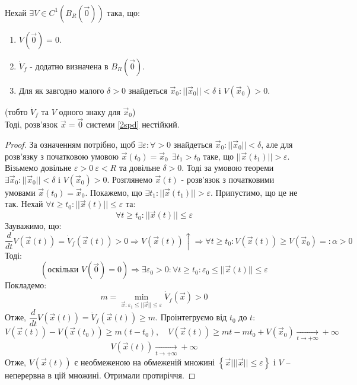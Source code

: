 \documentclass[14pt,a4paper]{scrartcl}
\theoremstyle{definition}
\theoremstyle{definition}
\theoremstyle{definition}
\begin{document}
\begin{boxteo} \ \\Нехай $\exists V \in C^{1} (B_R (\overrightarrow{0}))$ така, що:
\begin{enumerate}
  \item $V(\overrightarrow{0}) = 0$.
  \item $\dot{V}_f $ - додатно визначена в $B_R (\overrightarrow{0})$.
  \item Для як завгодно малого $\delta > 0 $ знайдеться $\overrightarrow{x}_0 : ||\overrightarrow{x}_0|| < \delta $ i $V (\overrightarrow{x}_0) > 0 $.
\end{enumerate}
(тобто $\dot{V}_f$ та $V$ одного знаку для $\overrightarrow{x}_0$)\\
Тоді, розв'язок $\overrightarrow{x} = \overrightarrow{0} $ системи \eqref{2spd} нестійкий.
\end{boxteo}

\begin{proof}
 За означенням потрібно, щоб $\exists \varepsilon : \forall > 0 $ знайдеться $\overrightarrow{x}_0 : ||\overrightarrow{x}_0|| < \delta$, але для розв'язку з початковою умовою $\overrightarrow{x}(t_0) = \overrightarrow{x}_0 \ \ \exists t_1 > t_0 $ таке, що $||\overrightarrow{x} (t_1)||>\varepsilon $. Візьмемо довільне $ \varepsilon > 0 \ \varepsilon  < R  $ та довільне $\delta > 0$. Тоді за умовою теореми $\exists \overrightarrow{x}_0 : ||\overrightarrow{x}_0|| < \delta $ і $V(\overrightarrow{x}_0) > 0$. Розглянемо $\overrightarrow{x}(t)$ - розв'язок з початковими умовами $\overrightarrow{x}(t_0) = \overrightarrow{x}_0$. Покажемо, що $\exists t_1 : ||\overrightarrow{x}(t_1)|| > \varepsilon $. Припустимо, що це не так. Нехай $\forall t \geq t_0 : ||\overrightarrow{x}(t)|| \leq \varepsilon $ та:
$$
\forall t \geq t_0 : ||\overrightarrow{x}(t)|| \leq \varepsilon
$$
Зауважимо, що:
$$
\frac{d}{dt} V(\overrightarrow{x}(t)) = \dot{V}_f (\overrightarrow{x}(t)) >0 \Longrightarrow V(\overrightarrow{x}(t)) \! \uparrow \Longrightarrow \forall t \geq t_0 : V(\overrightarrow{x}(t)) \geq  V(\overrightarrow{x}_0) =: \alpha > 0
$$
Тоді:
$$
(\text{оскільки } V(\overrightarrow{0}) = 0) \Longrightarrow \exists \varepsilon_0 >0 : \forall t \geq t_0 : \varepsilon _0 \leq ||\overrightarrow{x}(t)|| \leq \varepsilon
$$
Покладемо:$$m = \min\limits_{\overrightarrow{x} : \varepsilon_1 \leq ||\overrightarrow{x}|| \leq \varepsilon } \dot{V}_f(\overrightarrow{x}) > 0$$
Отже, $ \dfrac{d}{dt}V(\overrightarrow{x}(t))  = \dot{V}_f(\overrightarrow{x}(t)) \geq m $. Проінтегруємо від $t_0$ до $t$:
$$
V(\overrightarrow{x}(t)) - V(\overrightarrow{x}(t_0)) \geq m (t -t_0), \quad
V(\overrightarrow{x}(t)) \geq  mt - mt_0 + V(\overrightarrow{x}_0) \xrightarrow[t\to+\infty]{}+ \infty
$$
$$
V(\overrightarrow{x}(t)) \xrightarrow[t\to+\infty]{} + \infty
$$
Отже, $V(\overrightarrow{x}(t))$ є необмеженою на обмеженій множині $\left\lbrace \overrightarrow{x} \Big| ||\overrightarrow{x}|| \leq \varepsilon  \right\rbrace$ і $V$ -- неперервна в цій множині.
Отримали протиріччя.
\end{proof}
\end{document}
